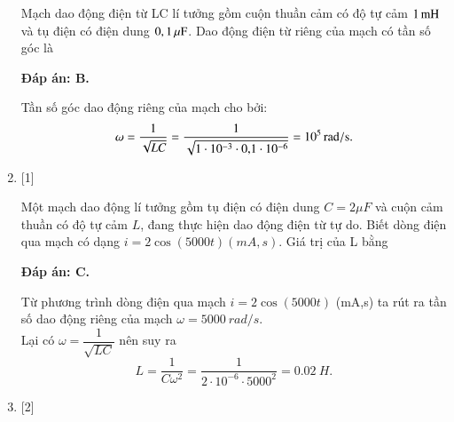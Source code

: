 \begin{enumerate}[label=\bfseries Câu \arabic*:]
	{Mạch dao động điện từ LC lí tưởng gồm cuộn thuần cảm có độ tự cảm $\xsi{1}{mH}$ và tụ điện có điện dung $\xsi{0,1}{\mu F}$. Dao động điện từ riêng của mạch có tần số góc là
	}
	
	\hideall
	{		\textbf{Đáp án: B.}
		
		Tần số góc dao động riêng của mạch cho bởi:
		$$\omega = \dfrac{1}{\sqrt{LC}} = \dfrac{1}{\sqrt{1\cdot10^{-3}\cdot \text{0,1}\cdot10^{-6}}} = \xsi{10^{5}}{rad/s}.$$
		
	}
	
	\item {} [1] %
	
	{Một mạch dao động lí tưởng gồm tụ điện có điện dung $C = 2 \mu F$ và cuộn cảm thuần có độ tự cảm $L$, đang thực hiện dao động điện từ tự do. Biết dòng điện qua mạch có dạng $i = 2 \cos \left( 5000t \right)(mA,s)$. Giá trị của L bằng
	}
	
	\hideall
	{		\textbf{Đáp án: C.}
		
		Từ phương trình dòng điện qua mạch $i = 2 \cos \left( 5000t \right)$ (mA,s) ta rút ra tần số dao động riêng của mạch $\omega = \SI{5000}{rad/s}$. \\
		Lại có $\omega = \dfrac{1}{\sqrt{LC}}$ nên suy ra 
		$$L = \dfrac{1}{C \omega^2} = \dfrac{1}{2\cdot10^{-6} \cdot 5000^2} = \SI{0,02}{H}.$$ 
		
	}
	
	\item {} [2] %
	

\end{enumerate}
